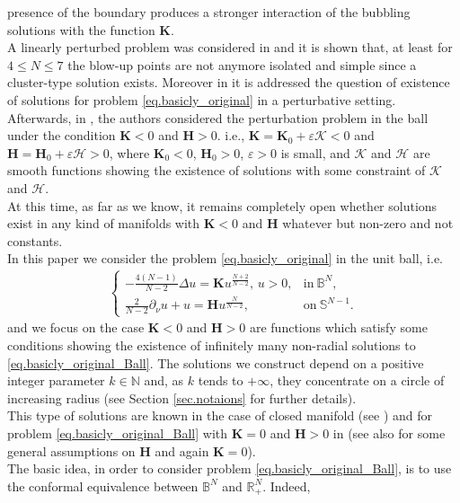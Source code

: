 \documentclass[11pt,a4paper]{amsart}
\begin{document}
presence of the boundary produces a stronger interaction of the bubbling solutions with the function $\mathbf K$.\\
A linearly perturbed problem was considered in \cite{Cruz-BlazquezPistoiaVaira_2022} and it is shown that, at least for $4\leq N\leq 7$  the blow-up points are not anymore isolated and simple since a cluster-type solution exists. Moreover in \cite{Cruz-BlazquezVaira_2025} it is addressed the question of existence of solutions for problem \eqref{eq.basicly_original} in a perturbative setting.
Afterwards, in \cite{BattagliaCruz-BlazquezPistoia_2023}, the authors considered the perturbation problem in the ball under the condition $\mathbf{K}<0$ and $\mathbf{H} > 0$. i.e., $\mathbf{K} = \mathbf{K}_0 + \varepsilon \mathcal{K} < 0$ and $\mathbf{H} = \mathbf{H}_0 + \varepsilon \mathcal{H} > 0$, where $\mathbf{K}_0 < 0$, $\mathbf{H}_0 > 0$, $\varepsilon > 0$ is small, and $\mathcal{K}$ and $\mathcal{H}$ are smooth functions showing the existence of solutions with some constraint of $\mathcal{K}$ and $\mathcal{H}$.\\
At this time, as far as we know, it remains completely open whether solutions exist in any kind of manifolds with $\mathbf K<0$ and $\mathbf H$ whatever but non-zero and not constants.\\
In this paper we consider the problem \eqref{eq.basicly_original} in the unit ball, i.e. 
\begin{align}\label{eq.basicly_original_Ball}
    \left\{\begin{array}{ll}
    -\frac{4(N-1)}{N-2}\Delta u=\mathbf{K} u^{\frac{N+2}{N-2}},\,u>0,&\text{in}~\mathbb B^N,\\[10pt]\frac2{N-2}\partial_\nu u+u=\mathbf{H}u^{\frac N{N-2}},&\text{on}~\mathbb S^{N-1}.
    \end{array}\right. 
    \end{align}
and we  focus on the case $\mathbf{K}<0$ and $\mathbf{H} > 0$ are functions which satisfy some conditions showing the existence of infinitely many non-radial solutions to \eqref{eq.basicly_original_Ball}. The solutions we construct depend on a positive integer parameter $k\in\mathbb N$ and, as $k$ tends to $+\infty$, they concentrate on a circle of increasing radius (see Section \ref{sec.notaions} for further details).\\
This type of solutions are known in the case of closed manifold (see \cite{WeiYan_2010a}) and for problem \eqref{eq.basicly_original_Ball} with $\mathbf K=0$ and $\mathbf H>0$  in \cite{WangZhao_2013} (see also \cite{BianChenYang} for some general assumptions on $\mathbf H$ and again $\mathbf K=0$). \\ The basic idea, in order to consider problem \eqref{eq.basicly_original_Ball}, is to use the conformal equivalence between $\mathbb B^N$ and $\mathbb R^N_+$. Indeed, 
\end{document}
